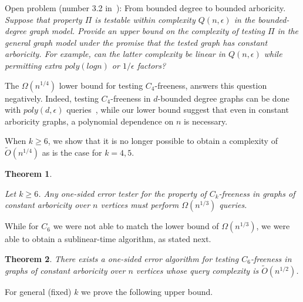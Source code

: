 \documentclass{article}
\newcommand{\eps}{\epsilon}
\newcommand{\poly}{\textrm{poly}}
\newtheorem{theorem}{Theorem}
\newcommand{\commentt}[1]{ {}}
\newcommand{\talya}[1]{{} }
\begin{document}
\smallskip\noindent\textsf{Open problem (number 3.2 in~\cite{goldreich2021open}): From bounded degree to bounded arboricity.} \newline
\textit{Suppose that property $\Pi$ is
testable within complexity $Q(n,\eps)$ in the bounded-degree graph model. Provide an upper
bound on the complexity of testing $\Pi$ in the general graph model under the promise that the tested graph has constant arboricity. For example, can the latter complexity be linear in $Q(n,\eps)$ while
permitting extra $poly(log n)$ or $1/\eps$ factors?}
\smallskip

The $\Omega(n^{1/4})$ lower bound for testing $C_4$-freeness, answers this question negatively. Indeed, %
testing $C_4$-freeness in $d$-bounded degree graphs  can be done with $poly(d,\eps)$ queries~\cite{GR-bound}, while our lower bound suggest that even in constant  arboricity graphs, a polynomial dependence on $n$ is necessary.

\smallskip
When $k \geq 6$, we show that it is no longer possible to obtain a complexity of $\widetilde{O}(n^{1/4})$ as is the case for $k=4,5$.

\newcommand{\GenLB}{
Let $k\geq 6$.
Any one-sided error tester for the property of $C_k$-freeness in graphs of constant arboricity over  $n$ vertices 
must perform $\Omega(n^{1/3})$ queries.
}


\begin{theorem}\label{thm:lb_ck_const_alpha}
\GenLB
\end{theorem}


While for $C_6$ we were not able to match the lower bound of $\Omega(n^{1/3})$, we were able to obtain a sublinear-time algorithm, as stated next.


\begin{theorem}\label{thm:C6-ub-intro}
There exists a one-sided error algorithm for testing $C_6$-freeness in graphs of constant arboricity  over $n$ vertices whose query complexity %
is $\widetilde{O}(n^{1/2})$.
\end{theorem}


\smallskip
For general (fixed) $k$ we prove the following upper bound. 
\end{document}
